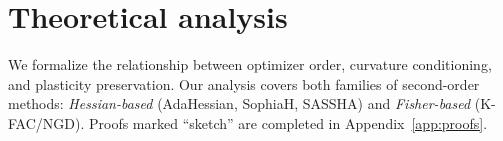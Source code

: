 \documentclass{article}
\newcommand{\RR}{\mathbb{R}}
\newcommand{\EE}{\mathbb{E}}
\newcommand{\cL}{\mathcal{L}}
\newcommand{\cT}{\mathcal{T}}
\begin{document}




\section{Theoretical analysis}
\label{sec:theory}


We formalize the relationship between optimizer order, curvature conditioning, and plasticity preservation. Our analysis covers both families of second-order methods: \emph{Hessian-based} (AdaHessian, SophiaH, SASSHA) and \emph{Fisher-based} (K-FAC/NGD). Proofs marked ``sketch'' are completed in Appendix~\ref{app:proofs}.


\end{document}
